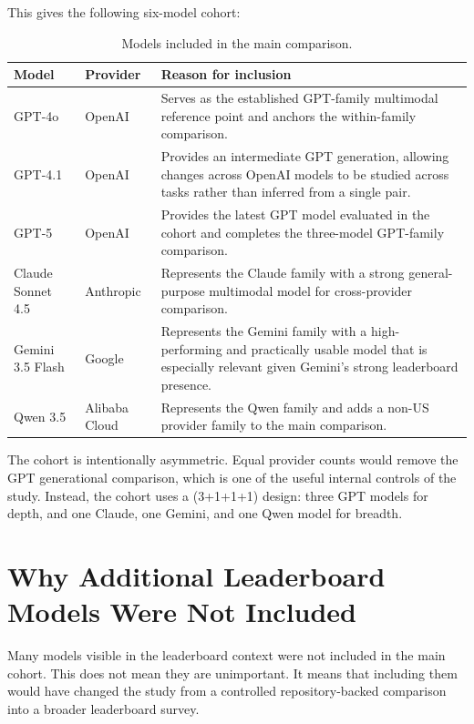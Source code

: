 \documentclass[11pt,a4paper]{report}
\begin{document}
This gives the following six-model cohort:

\begin{table}[H]
\centering
\small
\begin{tabularx}{\textwidth}{@{}l l X@{}}
\toprule
\textbf{Model} & \textbf{Provider} & \textbf{Reason for inclusion} \\
\midrule
GPT-4o
& OpenAI
& Serves as the established GPT-family multimodal reference point and anchors
the within-family comparison. \\

GPT-4.1
& OpenAI
& Provides an intermediate GPT generation, allowing changes across OpenAI
models to be studied across tasks rather than inferred from a single pair. \\

GPT-5
& OpenAI
& Provides the latest GPT model evaluated in the cohort and completes the
three-model GPT-family comparison. \\

Claude Sonnet 4.5
& Anthropic
& Represents the Claude family with a strong general-purpose multimodal model
for cross-provider comparison. \\

Gemini 3.5 Flash
& Google
& Represents the Gemini family with a high-performing and practically usable
model that is especially relevant given Gemini's strong leaderboard presence. \\

Qwen 3.5
& Alibaba Cloud
& Represents the Qwen family and adds a non-US provider family to the main
comparison. \\
\bottomrule
\end{tabularx}
\caption{Models included in the main comparison.}
\label{tab:included-models}
\end{table}

The cohort is intentionally asymmetric. Equal provider counts would remove the
GPT generational comparison, which is one of the useful internal controls of
the study. Instead, the cohort uses a (3+1+1+1) design: three GPT models for
depth, and one Claude, one Gemini, and one Qwen model for breadth.

\section{Why Additional Leaderboard Models Were Not Included}

Many models visible in the leaderboard context were not included in the main
cohort. This does not mean they are unimportant. It means that including them
would have changed the study from a controlled repository-backed comparison
into a broader leaderboard survey.
\end{document}
